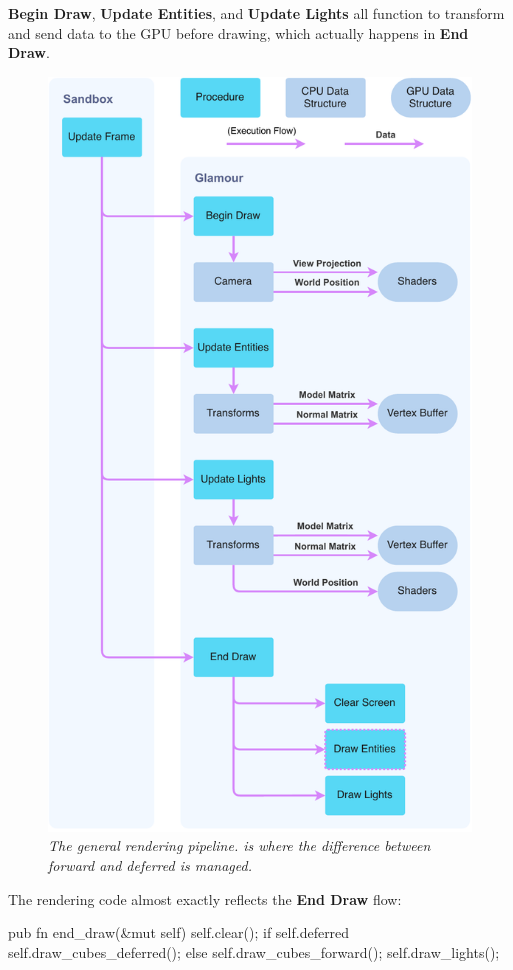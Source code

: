 \textbf{Begin Draw}, \textbf{Update Entities}, and \textbf{Update Lights} all function to transform and send data to the GPU before drawing, which actually happens in \textbf{End Draw}.

\begin{figure}[h!]
  \begin{center}
    \includegraphics[width=0.7\columnwidth]{../rendering-pipeline.pdf}
  \end{center}
  \caption[Rendering pipeline]{
    \emph{
      The general rendering pipeline.
       is where the difference between forward and deferred is managed.
    }
  }\label{fig:rendering-pipeline}
\end{figure}

The rendering code almost exactly reflects the \textbf{End Draw} flow:
  \begin{rustcode}
pub fn end_draw(&mut self) {
    self.clear();
    if self.deferred {
        self.draw_cubes_deferred();
    } else {
        self.draw_cubes_forward();
    }
    self.draw_lights();
}
  \end{rustcode}


